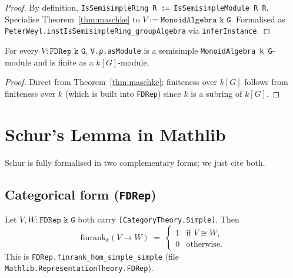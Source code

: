 \begin{proof}
  \leanok
  By definition, \texttt{IsSemisimpleRing R := IsSemisimpleModule R R}.
  Specialise Theorem~\ref{thm:maschke} to $V := \texttt{MonoidAlgebra k G}$.
  Formalised as
  \texttt{PeterWeyl.instIsSemisimpleRing\_groupAlgebra} via
  \texttt{inferInstance}.
\end{proof}

\begin{corollary}
  \label{cor:fdrep-semisimple}
  \leanok
  For every $V : \texttt{FDRep k G}$, \texttt{V.ρ.asModule} is a semisimple
  \texttt{MonoidAlgebra k G}-module and is finite as a $k[G]$-module.
\end{corollary}

\begin{proof}\leanok
  Direct from Theorem~\ref{thm:maschke}; finiteness over $k[G]$ follows from
  finiteness over $k$ (which is built into \texttt{FDRep}) since $k$ is a
  subring of $k[G]$.
\end{proof}


\chapter{Schur's Lemma in Mathlib}
\label{chap:schur}

Schur is fully formalised in two complementary forms; we just cite both.

\section{Categorical form (\texttt{FDRep})}

\begin{theorem}
  \label{thm:schur-fdrep}
  \mathlibok
  \leanok
  Let $V, W : \texttt{FDRep k G}$ both carry \texttt{[CategoryTheory.Simple]}.
  Then
  \[
     \mathrm{finrank}_k(V \to W) \;=\; \begin{cases}
       1 & \text{if } V \cong W,\\ 0 & \text{otherwise.} \end{cases}
  \]
  This is \texttt{FDRep.finrank\_hom\_simple\_simple} (file
  \texttt{Mathlib.RepresentationTheory.FDRep}).
\end{theorem}

